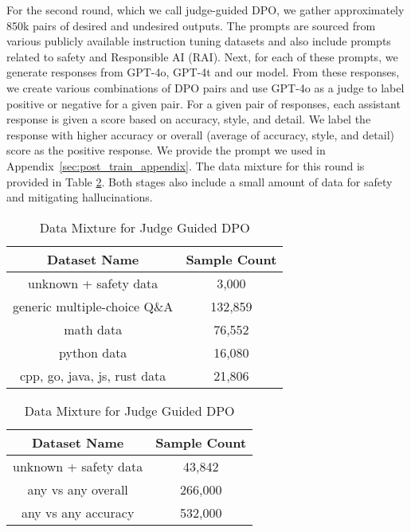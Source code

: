 For the second round, which we call judge-guided DPO, we gather approximately 850k pairs of desired and undesired outputs. The prompts are sourced from various publicly available instruction tuning datasets and also include prompts related to safety and Responsible AI (RAI).
Next, for each of these prompts, we generate responses from GPT-4o, GPT-4t and our model. From these responses, we create various combinations of DPO pairs and use GPT-4o as a judge to label positive or negative for a given pair. For a given pair of responses, each assistant response is given a score based on accuracy, style, and detail. 
We label the response with higher accuracy or overall (average of accuracy, style, and detail) score as the positive response. We provide the prompt we used in Appendix~\ref{sec:post_train_appendix}. The data mixture for this round is provided in Table \ref{tab:training_data_table_2}.
Both stages also include a small amount of data for safety and mitigating hallucinations.

\begin{table}[t!]
\centering
\small
\begin{minipage}{0.48\textwidth}
\centering
\begin{tabular}{@{}cc@{}}
\toprule
\textbf{Dataset Name} & \textbf{Sample Count} \\
\midrule
unknown + safety data & 3,000 \\
generic multiple-choice Q\&A & 132,859 \\
math data & 76,552 \\
python data & 16,080 \\
cpp, go, java, js, rust data & 21,806 \\
\bottomrule
\end{tabular}
\caption{Data Mixture for Pivotal Token DPO}
\label{tab:training_data_table_1}
\end{minipage}
\hfill
\begin{minipage}{0.48\textwidth}
\centering
\begin{tabular}{@{}cc@{}}
\toprule
\textbf{Dataset Name} & \textbf{Sample Count} \\
\midrule
unknown + safety data & 43,842 \\
any vs any overall & 266,000 \\
any vs any accuracy & 532,000 \\
\bottomrule
\end{tabular}
\caption{Data Mixture for Judge Guided DPO}
\label{tab:training_data_table_2}
\end{minipage}
\end{table}

